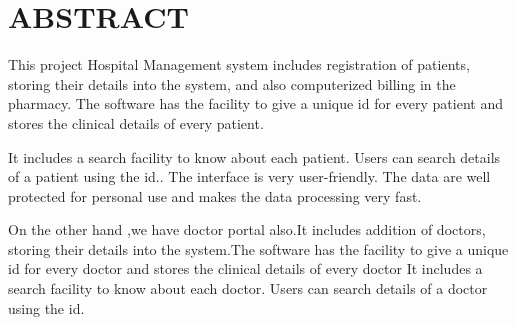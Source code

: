 \documentclass[a4paper, 14pt]{report}
\begin{document}
\chapter{ABSTRACT}
{\Large
This project Hospital Management system includes registration of patients, storing their details into the system, and also computerized billing in the pharmacy. The software has the facility to give a unique id for every patient and stores the clinical details of every patient.

 It includes a search facility to know about each patient. Users can search details of a patient using the id.. The interface is very user-friendly. The data are well protected for personal use and makes the data processing very fast.

On the other hand ,we have doctor portal also.It includes addition of doctors, storing their details into the system.The software has the facility to give a unique id for every doctor and stores the clinical details of every doctor
 It includes a search facility to know about each doctor. Users can search details of a doctor using the id.
}
\end{document}
